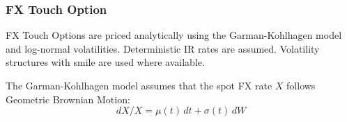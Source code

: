 \subsubsection{FX Touch Option}
\label{pricing:fx_touchoption}

FX Touch Options are priced analytically using the Garman-Kohlhagen 
model and log-normal volatilities.  Deterministic IR rates are assumed. Volatility 
structures with smile are used where available.

The Garman-Kohlhagen model assumes that the spot FX rate $X$ follows Geometric 
Brownian Motion:
$$
dX/X=\mu(t)\,dt+\sigma(t)\,dW
$$
